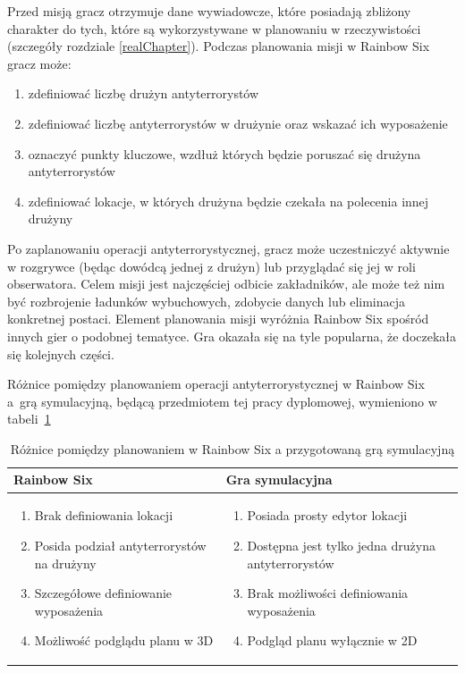 Przed misją gracz otrzymuje dane wywiadowcze, które posiadają zbliżony charakter do tych, które są wykorzystywane w planowaniu w rzeczywistości (szczegóły rozdziale \ref{realChapter}). Podczas planowania misji w Rainbow Six gracz może:
\begin{enumerate}
	\item zdefiniować liczbę drużyn antyterrorystów
	\item zdefiniować liczbę antyterrorystów w drużynie oraz wskazać ich wyposażenie	
	\item oznaczyć punkty kluczowe, wzdłuż których będzie poruszać się drużyna antyterrorystów
	\item zdefiniować lokacje, w których drużyna będzie czekała na polecenia innej drużyny
\end{enumerate}

Po zaplanowaniu operacji antyterrorystycznej, gracz może uczestniczyć aktywnie w rozgrywce (będąc dowódcą jednej z drużyn) lub przyglądać się jej w roli obserwatora. Celem misji jest najczęściej odbicie zakładników, ale może też nim być rozbrojenie ładunków wybuchowych, zdobycie danych lub eliminacja konkretnej postaci. Element planowania misji wyróżnia Rainbow Six spośród innych gier o podobnej tematyce. Gra okazała się na tyle popularna, że doczekała się kolejnych części.

Różnice pomiędzy planowaniem operacji antyterrorystycznej w Rainbow Six a~grą symulacyjną, będącą przedmiotem tej pracy dyplomowej, wymieniono w tabeli~\ref{diffTab}

\begin{table}
\begin{center}
\begin{tabular}{p{} p{}}
Rainbow Six & Gra symulacyjna\\\hline
	\begin{enumerate}
		\setlength\itemsep{0pt}
		\item Brak definiowania lokacji
		\item Posida podział antyterrorystów na drużyny	
		\item Szczegółowe definiowanie wyposażenia 	
		\item Możliwość podglądu planu w 3D			
	\end{enumerate}&\begin{enumerate}
		\setlength\itemsep{0pt}
		\item Posiada prosty edytor lokacji
		\item Dostępna jest tylko jedna drużyna antyterrorystów
		\item Brak możliwości definiowania wyposażenia
		\item Podgląd planu wyłącznie w 2D
	\end{enumerate}
\end{tabular}
\caption {Różnice pomiędzy planowaniem w Rainbow Six a przygotowaną grą symulacyjną\label{diffTab}}
\end{center}
\end{table} 

